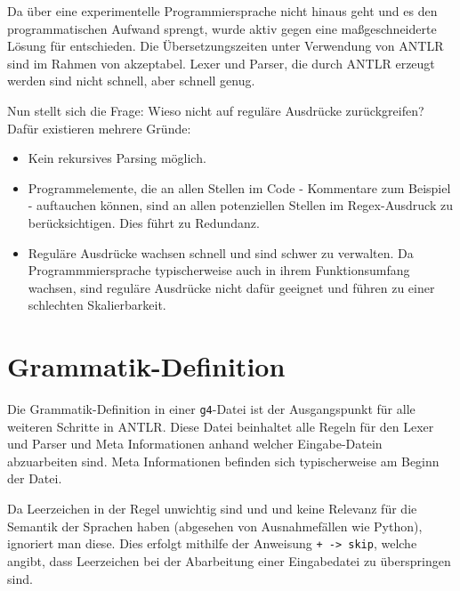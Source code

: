 Da \toya über eine experimentelle Programmiersprache nicht hinaus geht und es den programmatischen Aufwand sprengt, wurde aktiv gegen eine maßgeschneiderte Lösung für \toya entschieden. Die Übersetzungszeiten unter Verwendung von ANTLR sind im Rahmen von \toya akzeptabel. Lexer und Parser, die durch ANTLR erzeugt werden sind nicht schnell, aber schnell genug.

Nun stellt sich die Frage: Wieso nicht auf reguläre Ausdrücke zurückgreifen? Dafür existieren mehrere Gründe:
\begin{itemize}
    \item Kein rekursives Parsing möglich.
    \item Programmelemente, die an allen Stellen im Code - Kommentare zum Beispiel - auftauchen können, sind an allen potenziellen Stellen im Regex-Ausdruck zu berücksichtigen. Dies führt zu Redundanz.
    \item Reguläre Ausdrücke wachsen schnell und sind schwer zu verwalten. Da Programmmiersprache typischerweise auch in ihrem Funktionsumfang wachsen, sind reguläre Ausdrücke nicht dafür geeignet und führen zu einer schlechten Skalierbarkeit.
\end{itemize}


\section{Grammatik-Definition}

Die Grammatik-Definition in einer \texttt{g4}-Datei ist der Ausgangspunkt für alle weiteren Schritte in ANTLR. Diese Datei beinhaltet alle Regeln für den Lexer und Parser und Meta Informationen anhand welcher Eingabe-Datein abzuarbeiten sind. Meta Informationen befinden sich typischerweise am Beginn der Datei.

Da Leerzeichen in der Regel unwichtig sind und und keine Relevanz für die Semantik der Sprachen haben (abgesehen von Ausnahmefällen wie Python), ignoriert man diese. Dies erfolgt mithilfe der Anweisung \texttt{+ -> skip}, welche angibt, dass Leerzeichen bei der Abarbeitung einer Eingabedatei zu überspringen sind.


